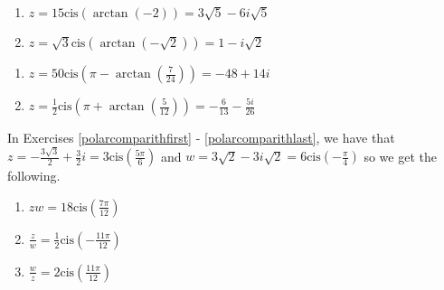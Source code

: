 \documentclass{ximera}
\begin{document}
\begin{multicols}{2} 

\begin{enumerate}

\setcounter{enumi}{\value{HW}}

\item $z = 15\text{cis}\left(\arctan\left(-2\right)\right) = 3\sqrt{5} -6i\sqrt{5}$ 
\item $z=  \sqrt{3}\text{cis}\left(\arctan\left(-\sqrt{2}\right)\right) = 1-i\sqrt{2}$

\setcounter{HW}{\value{enumi}}

\end{enumerate}

\end{multicols}

\begin{multicols}{2} 

\begin{enumerate}

\setcounter{enumi}{\value{HW}}

\item $z = 50\text{cis}\left(\pi-\arctan\left(\frac{7}{24}\right)\right) = -48 + 14i$ 
\item $z = \frac{1}{2}\text{cis}\left(\pi+\arctan\left(\frac{5}{12}\right)\right) = -\frac{6}{13} - \frac{5i}{26}$

\setcounter{HW}{\value{enumi}}

\end{enumerate}

\end{multicols}

\pagebreak

In Exercises \ref{polarcomparithfirst} - \ref{polarcomparithlast}, we have that $z = -\frac{3\sqrt{3}}{2} + \frac{3}{2}i = 3\text{cis}\left(\frac{5\pi}{6}\right)$ and $w = 3\sqrt{2} - 3i\sqrt{2} = 6\text{cis}\left(-\frac{\pi}{4}\right)$ so we get the following.  

\begin{multicols}{3}

\begin{enumerate}

\setcounter{enumi}{\value{HW}}

\item $zw = 18\text{cis}\left(\frac{7\pi}{12}\right)$
\item $\frac{z}{w} = \frac{1}{2}\text{cis}\left(-\frac{11\pi}{12}\right)$
\item $\frac{w}{z} = 2\text{cis}\left(\frac{11\pi}{12}\right)$

\setcounter{HW}{\value{enumi}}

\end{enumerate}

\end{multicols}
\end{document}
